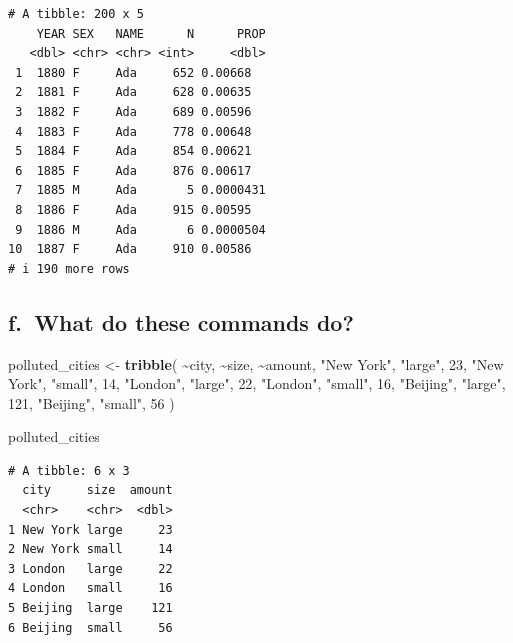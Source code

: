 \documentclass[
]{book}
\newenvironment{Shaded}{\begin{snugshade}}{\end{snugshade}}
\newcommand{\DecValTok}[1]{\textcolor[rgb]{0.00,0.00,0.81}{#1}}
\newcommand{\FunctionTok}[1]{\textcolor[rgb]{0.13,0.29,0.53}{\textbf{#1}}}
\newcommand{\NormalTok}[1]{#1}
\newcommand{\OtherTok}[1]{\textcolor[rgb]{0.56,0.35,0.01}{#1}}
\newcommand{\SpecialCharTok}[1]{\textcolor[rgb]{0.81,0.36,0.00}{\textbf{#1}}}
\newcommand{\StringTok}[1]{\textcolor[rgb]{0.31,0.60,0.02}{#1}}
\begin{document}
\begin{verbatim}
# A tibble: 200 x 5
    YEAR SEX   NAME      N      PROP
   <dbl> <chr> <chr> <int>     <dbl>
 1  1880 F     Ada     652 0.00668  
 2  1881 F     Ada     628 0.00635  
 3  1882 F     Ada     689 0.00596  
 4  1883 F     Ada     778 0.00648  
 5  1884 F     Ada     854 0.00621  
 6  1885 F     Ada     876 0.00617  
 7  1885 M     Ada       5 0.0000431
 8  1886 F     Ada     915 0.00595  
 9  1886 M     Ada       6 0.0000504
10  1887 F     Ada     910 0.00586  
# i 190 more rows
\end{verbatim}

\hypertarget{f.-what-do-these-commands-do}{%
\subsection{f.~What do these commands do?}\label{f.-what-do-these-commands-do}}

\begin{Shaded}
\begin{Highlighting}[]
\NormalTok{polluted\_cities }\OtherTok{\textless{}{-}} \FunctionTok{tribble}\NormalTok{(}
       \SpecialCharTok{\textasciitilde{}}\NormalTok{city,   }\SpecialCharTok{\textasciitilde{}}\NormalTok{size, }\SpecialCharTok{\textasciitilde{}}\NormalTok{amount, }
  \StringTok{"New York"}\NormalTok{, }\StringTok{"large"}\NormalTok{,      }\DecValTok{23}\NormalTok{,}
  \StringTok{"New York"}\NormalTok{, }\StringTok{"small"}\NormalTok{,      }\DecValTok{14}\NormalTok{,}
    \StringTok{"London"}\NormalTok{, }\StringTok{"large"}\NormalTok{,      }\DecValTok{22}\NormalTok{,}
    \StringTok{"London"}\NormalTok{, }\StringTok{"small"}\NormalTok{,      }\DecValTok{16}\NormalTok{,}
   \StringTok{"Beijing"}\NormalTok{, }\StringTok{"large"}\NormalTok{,      }\DecValTok{121}\NormalTok{,}
   \StringTok{"Beijing"}\NormalTok{, }\StringTok{"small"}\NormalTok{,      }\DecValTok{56}
\NormalTok{)}

\NormalTok{polluted\_cities}
\end{Highlighting}
\end{Shaded}

\begin{verbatim}
# A tibble: 6 x 3
  city     size  amount
  <chr>    <chr>  <dbl>
1 New York large     23
2 New York small     14
3 London   large     22
4 London   small     16
5 Beijing  large    121
6 Beijing  small     56
\end{verbatim}
\end{document}
